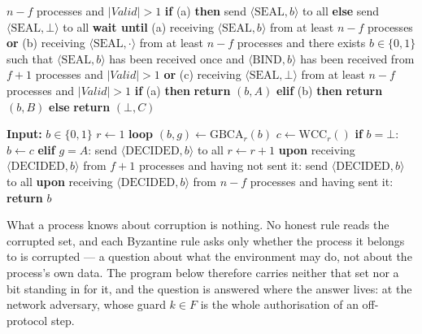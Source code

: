 \begin{algorithm}
\begin{algorithmic}
          $n - f$ processes and $|\mathit{Valid}| > 1$
        \State\quad \textbf{if} (a) \textbf{then} send $\langle\mathrm{SEAL}, b\rangle$
          to all \textbf{else} send $\langle\mathrm{SEAL}, \bot\rangle$ to all
        \State \textbf{wait until}
        \State\quad (a) receiving $\langle\mathrm{SEAL}, b\rangle$ from at least
          $n - f$ processes \textbf{or}
        \State\quad (b) receiving $\langle\mathrm{SEAL}, \cdot\rangle$ from at least
          $n - f$ processes and
        \State\quad there exists $b \in \{0,1\}$ such that $\langle\mathrm{SEAL}, b\rangle$
          has been received once and
        \State\quad $\langle\mathrm{BIND}, b\rangle$ has been received from $f + 1$
          processes and $|\mathit{Valid}| > 1$ \textbf{or}
        \State\quad (c) receiving $\langle\mathrm{SEAL}, \bot\rangle$ from at least
          $n - f$ processes and $|\mathit{Valid}| > 1$
        \State\quad \textbf{if} (a) \textbf{then} \textbf{return} $(b, A)$
          \textbf{elif} (b) \textbf{then} \textbf{return} $(b, B)$
          \textbf{else} \textbf{return} $(\bot, C)$
    \end{algorithmic}
\end{algorithm}

\begin{algorithm}
    \caption{Implementation of ABA. Algorithm 1 of the source blueprint, after
      Abraham, Ben-David and Yandamuri \cite{ABDY22}}
    \label{alg:aba-core}
    \begin{algorithmic}
        \State \textbf{Input:} $b \in \{0,1\}$
        \medskip
        \State $r \gets 1$
        \State \textbf{loop}
        \State\quad $(b, g) \gets \mathrm{GBCA}_r(b)$
        \State\quad $c \gets \mathrm{WCC}_r()$
        \State\quad \textbf{if} $b = \bot$:
        \State\quad\quad $b \gets c$
        \State\quad \textbf{elif} $g = A$:
        \State\quad\quad send $\langle\mathrm{DECIDED}, b\rangle$ to all
        \State\quad $r \gets r + 1$
        \medskip
        \State \textbf{upon} receiving $\langle\mathrm{DECIDED}, b\rangle$ from
          $f + 1$ processes and having not sent it:
        \State\quad send $\langle\mathrm{DECIDED}, b\rangle$ to all
        \State \textbf{upon} receiving $\langle\mathrm{DECIDED}, b\rangle$ from
          $n - f$ processes and having sent it:
        \State\quad \textbf{return} $b$
    \end{algorithmic}
\end{algorithm}

What a process knows about corruption is nothing.
No honest rule reads the corrupted set, and each Byzantine rule
asks only whether the process it belongs to is corrupted --- a question about
what the environment may do, not about the process's own data.
The program below therefore carries neither that set nor a bit standing in for
it, and the question is answered where the answer lives: at the network
adversary, whose guard $k \in F$ is the whole authorisation of an off-protocol
step.

